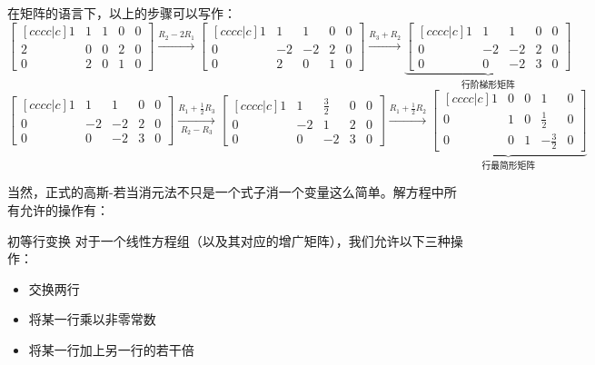 \documentclass{ctexart}
\begin{document}
在矩阵的语言下，以上的步骤可以写作：
\[
    \begin{bmatrix}[cccc|c]
        1 & 1 & 1 & 0 & 0\\
        2 & 0 & 0 & 2 & 0\\
        0 & 2 & 0 & 1 & 0
    \end{bmatrix}
    \xrightarrow{R_{2} - 2R_{1}}
    \begin{bmatrix}[cccc|c]
        1 & 1 & 1 & 0 & 0\\
        0 & -2 & -2 & 2 & 0\\
        0 & 2 & 0 & 1 & 0
    \end{bmatrix}
    \xrightarrow{R_{3} + R_{2}}
    \underbrace{
        \begin{bmatrix}[cccc|c]
            1 & 1 & 1 & 0 & 0\\
            0 & -2 & -2 & 2 & 0\\
            0 & 0 & -2 & 3 & 0
    \end{bmatrix}}_{\text{行阶梯形矩阵}}
\]
\[
    \begin{bmatrix}[cccc|c]
        1 & 1 & 1 & 0 & 0\\
        0 & -2 & -2 & 2 & 0\\
        0 & 0 & -2 & 3 & 0
    \end{bmatrix}
    \xrightarrow[R_{2} - R_{3}]{R_{1} + \frac{1}{2}R_{3}}
    \begin{bmatrix}[cccc|c]
        1 & 1 & \frac{3}{2} & 0 & 0\\
        0 & -2 & 1 & 2 & 0\\
        0 & 0 & -2 & 3 & 0
    \end{bmatrix}
    \xrightarrow{R_{1} + \frac{1}{2}R_{2}}
    \underbrace{
        \begin{bmatrix}[cccc|c]
            1 & 0 & 0 & 1 & 0\\
            0 & 1 & 0 & \frac{1}{2} & 0\\
            0 & 0 & 1 & -\frac{3}{2} & 0
    \end{bmatrix}}_{\text{行最简形矩阵}}
\]

当然，正式的高斯-若当消元法不只是一个式子消一个变量这么简单。解方程中所有允许的操作有：
\begin{definition}{初等行变换}
    对于一个线性方程组（以及其对应的增广矩阵），我们允许以下三种操作：
    \begin{itemize}
        \item 交换两行
        \item 将某一行乘以非零常数
        \item 将某一行加上另一行的若干倍
    \end{itemize}
\end{definition}
\end{document}
